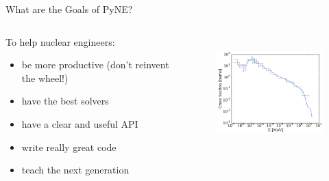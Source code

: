 \documentclass[xcolor=x11names,compress]{beamer}
\begin{document}
\begin{frame}{What are the Goals of PyNE?}

    \begin{columns}
    \begin{column}{0.45\textwidth}
        To help nuclear engineers:
        \begin{itemize}
        \item be more \alert{productive} (don't reinvent the wheel!)
        \item have the \alert{best solvers}
        \item have a \alert{clear and useful API}
        \item write really \alert{great code}
        \item \alert{teach} the next generation
        \end{itemize}
  	\end{column}
 	\begin{column}{0.45\textwidth}
 	   \begin{center}
 	   \begin{figure}
 	   \includegraphics[height=1.75in,clip]{xs.pdf}  \\
	   \end{figure}
 	   \end{center}
  	\end{column}
	\end{columns}

\end{frame}

\end{document}
